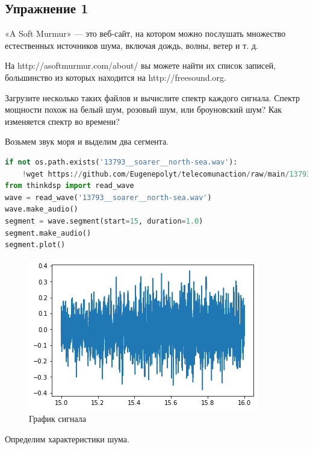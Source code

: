 \subsection{Упражнение 1}

«A Soft Murmur» — это веб-сайт, на котором можно послушать множество естественных источников шума, включая дождь, волны, ветер и т. д. 

\noindent На http://asoftmurmur.com/about/ вы можете найти их список записей, большинство из которых находится на http://freesound.org.

\noindent Загрузите несколько таких файлов и вычислите спектр каждого сигнала. Спектр мощности похож на белый шум, розовый шум, или броуновский шум? Как изменяется спектр во времени?

Возьмем звук моря и выделим два сегмента.

\begin{lstlisting}[language=Python]
if not os.path.exists('13793__soarer__north-sea.wav'):
    !wget https://github.com/Eugenepolyt/telecomunaction/raw/main/13793__soarer__north-sea.wav
from thinkdsp import read_wave
wave = read_wave('13793__soarer__north-sea.wav')
wave.make_audio()
segment = wave.segment(start=15, duration=1.0)
segment.make_audio()
segment.plot()
\end{lstlisting}
\begin{figure}[H]
	\begin{center}
		\includegraphics[scale=1]{fig/lab04/lab04_1.png}
		\caption{График сигнала}
	\end{center}
\end{figure}

Определим характеристики шума.

